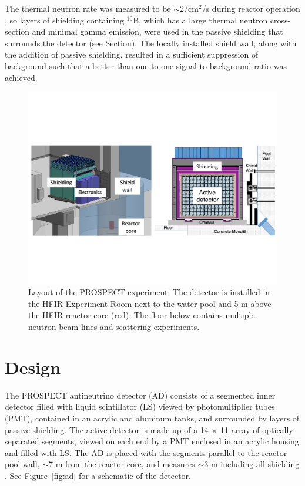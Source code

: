 The thermal neutron rate was measured to be $\sim$2/cm$^2$/s during reactor operation \cite{Ashenfelter:2015tpm}, so layers of shielding containing $^{10}$B, which has a large thermal neutron cross-section and minimal gamma emission, were used in the passive shielding that surrounds the detector (see Section). 
The locally installed shield wall, along with the addition of passive shielding, resulted in a sufficient suppression of background such that a better than one-to-one signal to background ratio was achieved. 

\begin{figure}[t]
	\centering
	\includegraphics[width=0.5\linewidth]{tex/4-prospect-images/Shielding}
	\caption[Layout of PROSPECT at HFIR]{Layout of the PROSPECT experiment. The detector is installed in the HFIR Experiment Room next to the water pool and 5 m above the HFIR reactor core (red). The floor below contains multiple neutron beam-lines and scattering experiments.}
	\label{fig:shielding}
\end{figure}

\section{Design}

The PROSPECT antineutrino detector (AD) consists of a segmented inner detector filled with liquid scintillator (LS) viewed by photomultiplier tubes (PMT), contained in an acrylic and aluminum tanks, and surrounded by layers of passive shielding. 
The active detector is made up of a 14  $\times$ 11 array of optically separated segments, viewed on each end by a PMT enclosed in an acrylic housing and filled with LS. 
The AD is placed with the segments parallel to the reactor pool wall, $\sim$7 m from the reactor core, and measures $\sim$3 m including all shielding . 
See Figure~\ref{fig:ad} for a schematic of the detector. 

